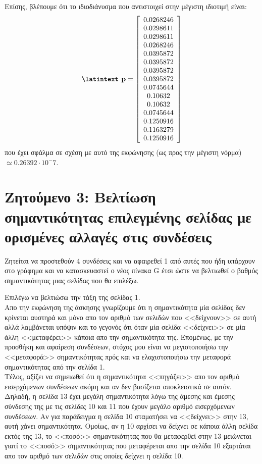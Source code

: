 \documentclass[a4paper,11pt]{article}
\newcommand{\lt}{\latintext}
\begin{document}
Επίσης, βλέπουμε ότι το ιδιοδιάνυσμα που αντιστοιχεί στην μέγιστη ιδιοτιμή είναι:\\
\[\textbf{{\lt p}}=
    \left[ \begin{array}{c}
    0.0268246 \\
    0.0298611 \\
    0.0298611 \\
    0.0268246 \\
    0.0395872 \\
    0.0395872 \\
    0.0395872 \\
    0.0395872 \\
    0.0745644 \\
    0.10632 \\
    0.10632 \\
    0.0745644 \\
    0.1250916 \\
    0.1163279 \\
    0.1250916 \\
    \end{array} \right]
\]
που έχει σφάλμα σε σχέση με αυτό της εκφώνησης (ως προς την μέγιστη νόρμα) $\simeq 0.26392 \cdot 10 ^ -7$.

\section*{Ζητούμενο 3: Βελτίωση σημαντικότητας επιλεγμένης σελίδας με ορισμένες αλλαγές στις συνδέσεις}
Ζητείται να προστεθούν 4 συνδέσεις και να αφαιρεθεί 1 από αυτές που ήδη υπάρχουν στο γράφημα και να κατασκευαστεί ο νέος πίνακα {\lt G} έτσι ώστε να βελτιωθεί ο βαθμός σημαντικότητας μιας σελίδας που θα επιλέξω.\\

\par
Επιλέγω να βελτιώσω την τάξη της σελίδας 1.\\
Απο την εκφώνηση της άσκησης γνωρίζουμε ότι η σημαντικότητα μία σελίδας δεν κρίνεται αυστηρά και μόνο απο τον αριθμό των σελιδών που <<δείχνουν>> σε αυτή αλλά λαμβάνεται υπόψιν και το γεγονός ότι όταν μία σελίδα <<δείχνει>> σε μία άλλη <<μεταφέρει>> κάποια απο την σημαντικότητα της. Επομένως, με την προσθήκη και αφαίρεση συνδέσεων, στόχος μου είναι να μεγιστοποιήσω την <<μεταφορά>> σημαντικότητας πρός και να ελαχιστοποιήσω την μεταφορά σημαντικότητας από την σελίδα 1. \\
Τέλος, αξίζει να σημειωθεί ότι η σημαντικότητα <<πηγάζει>> απο τον αριθμό εισερχόμενων συνδέσεων ακόμη και αν δεν βασίζεται αποκλειστικά σε αυτόν. Δηλαδή, η σελίδα 13 έχει μεγάλη σημαντικότητα λόγω της άμεσης και έμεσης σύνδεσης της με τις σελίδες 10 και 11 που έχουν μεγάλο αριθμό εισερχόμενων συνδέσεων. Αν για παράδειγμα η σελίδα 10 σταματήσει να <<δείχνει>> στην 13, αυτή χάνει σημαντικότητα. Ομοίως, αν η 10 αρχίσει να δείχνει σε κάποια άλλη σελίδα εκτός της 13, το <<ποσό>> σημαντικότητας που θα μεταφερθεί στην 13 μειώνεται γιατί το <<ποσό>> σημαντικότητας που μεταφέρεται απο την σελίδα 10 εξαρτάται απο τον αριθμό των σελιδών στις οποίες δείχνει η σελίδα 10.\\
\end{document}
